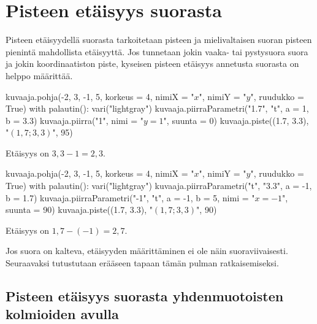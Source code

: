 \section{Pisteen etäisyys suorasta}


Pisteen etäisyydellä suorasta tarkoitetaan pisteen ja mielivaltaisen suoran pisteen pienintä mahdollista etäisyyttä.
Jos tunnetaan jokin vaaka- tai pystysuora suora ja jokin koordinaatiston piste, kyseisen pisteen etäisyys annetusta suorasta on helppo määrittää.

\begin{minipage}{0.45\textwidth}
\begin{kuva}
    kuvaaja.pohja(-2, 3, -1, 5, korkeus = 4, nimiX = "$x$", nimiY = "$y$", ruudukko = True)
    with palautin():
        vari("lightgray")
        kuvaaja.piirraParametri("1.7", "t", a = 1, b = 3.3)
    kuvaaja.piirra("1", nimi = "$y=1$", suunta = 0)
    kuvaaja.piste((1.7, 3.3), "$(1,7; 3,3)$", 95)
\end{kuva}

Etäisyys on $3,3-1=2,3$.
\end{minipage}
\begin{minipage}{0.45\textwidth}
\begin{kuva}
    kuvaaja.pohja(-2, 3, -1, 5, korkeus = 4, nimiX = "$x$", nimiY = "$y$", ruudukko = True)
    with palautin():
        vari("lightgray")
        kuvaaja.piirraParametri("t", "3.3", a = -1, b = 1.7)
    kuvaaja.piirraParametri("-1", "t", a = -1, b = 5, nimi = "$x = -1$", suunta = 90)
    kuvaaja.piste((1.7, 3.3), "$(1,7; 3,3)$", 90)
\end{kuva}

Etäisyys on $1,7-(-1)=2,7$.
\end{minipage}

Jos suora on kalteva, etäisyyden määrittäminen ei ole näin suoraviivaisesti.
Seuraavaksi tutustutaan erääseen tapaan tämän pulman ratkaisemiseksi.

\subsection*{Pisteen etäisyys suorasta yhdenmuotoisten kolmioiden avulla}

